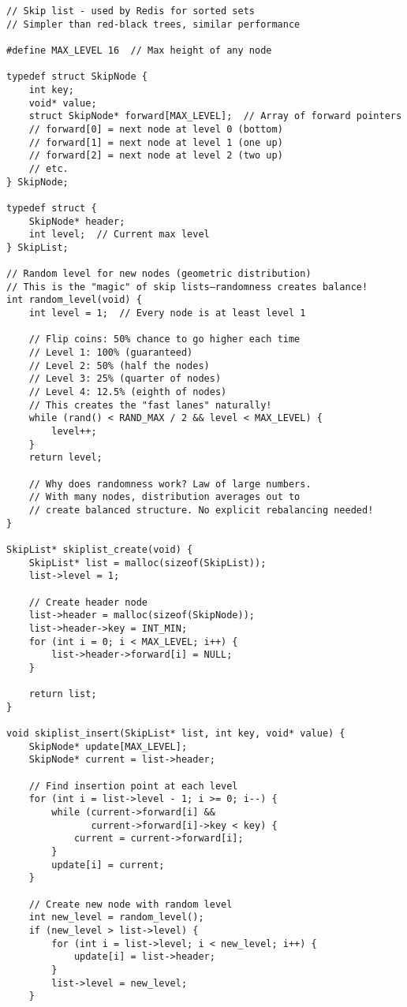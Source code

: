 \begin{lstlisting}
// Skip list - used by Redis for sorted sets
// Simpler than red-black trees, similar performance

#define MAX_LEVEL 16  // Max height of any node

typedef struct SkipNode {
    int key;
    void* value;
    struct SkipNode* forward[MAX_LEVEL];  // Array of forward pointers
    // forward[0] = next node at level 0 (bottom)
    // forward[1] = next node at level 1 (one up)
    // forward[2] = next node at level 2 (two up)
    // etc.
} SkipNode;

typedef struct {
    SkipNode* header;
    int level;  // Current max level
} SkipList;

// Random level for new nodes (geometric distribution)
// This is the "magic" of skip lists—randomness creates balance!
int random_level(void) {
    int level = 1;  // Every node is at least level 1

    // Flip coins: 50% chance to go higher each time
    // Level 1: 100% (guaranteed)
    // Level 2: 50% (half the nodes)
    // Level 3: 25% (quarter of nodes)
    // Level 4: 12.5% (eighth of nodes)
    // This creates the "fast lanes" naturally!
    while (rand() < RAND_MAX / 2 && level < MAX_LEVEL) {
        level++;
    }
    return level;

    // Why does randomness work? Law of large numbers.
    // With many nodes, distribution averages out to
    // create balanced structure. No explicit rebalancing needed!
}

SkipList* skiplist_create(void) {
    SkipList* list = malloc(sizeof(SkipList));
    list->level = 1;

    // Create header node
    list->header = malloc(sizeof(SkipNode));
    list->header->key = INT_MIN;
    for (int i = 0; i < MAX_LEVEL; i++) {
        list->header->forward[i] = NULL;
    }

    return list;
}

void skiplist_insert(SkipList* list, int key, void* value) {
    SkipNode* update[MAX_LEVEL];
    SkipNode* current = list->header;

    // Find insertion point at each level
    for (int i = list->level - 1; i >= 0; i--) {
        while (current->forward[i] &&
               current->forward[i]->key < key) {
            current = current->forward[i];
        }
        update[i] = current;
    }

    // Create new node with random level
    int new_level = random_level();
    if (new_level > list->level) {
        for (int i = list->level; i < new_level; i++) {
            update[i] = list->header;
        }
        list->level = new_level;
    }


\end{lstlisting}
